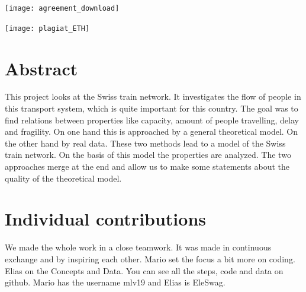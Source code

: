 \documentclass[11pt]{article}
\begin{document}

\newpage


\newpage

\texttt{[image: agreement\_download]}

\newpage





\newpage

\texttt{[image: plagiat\_ETH]}

\newpage



\tableofcontents

\newpage




\section{Abstract}

This project looks at the Swiss train network. It investigates the flow of people in this transport system, which is quite important for this country. The goal was to find relations between properties like capacity, amount of people travelling, delay and fragility. On one hand this is approached by a general theoretical model. On the other hand by real data. These two methods lead to a model of the Swiss train  network. On the basis of this model the properties are analyzed. The two approaches merge at the end and allow us to make some statements about the quality of the theoretical model.
 

\section{Individual contributions}

We made the whole work in a close teamwork. It was made in continuous exchange and by inspiring each other. Mario set the focus a bit more on coding. Elias on the Concepts and Data. You can see all the steps, code and data on github. Mario has the username mlv19 and Elias is EleSwag.\newline
\end{document}
